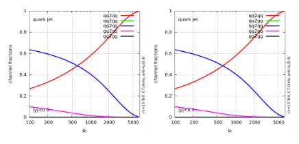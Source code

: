 \begin{figure}
\begin{center}
\includegraphics[width=0.49\textwidth, page=9]{figs/fractions.pdf} \hfill
\includegraphics[width=0.49\textwidth, page=10]{figs/fractions.pdf}
\caption{}
\label{fig:born_studies} 
\end{center}
\end{figure}

